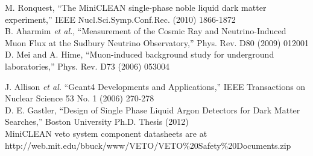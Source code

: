 \documentclass{JINST}
\begin{document}
\begin{thebibliography}{999}

M. Ronquest, ``The MiniCLEAN single-phase noble liquid dark matter experiment,'' IEEE Nucl.Sci.Symp.Conf.Rec. (2010) 1866-1872 \\

B. Aharmim {\it et al.}, ``Measurement of the Cosmic Ray and Neutrino-Induced Muon Flux at the Sudbury Neutrino Observatory,'' Phys. Rev. D80 (2009) 012001 \\

D. Mei and A. Hime, ``Muon-induced background study for underground laboratories,'' Phys. Rev. D73 (2006) 053004

J. Allison {\it et al.} ``Geant4 Developments and Applications,'' IEEE Transactions on Nuclear Science 53 No. 1 (2006) 270-278 \\

D. E. Gastler, ``Design of Single Phase Liquid Argon Detectors for Dark Matter Searches,'' Boston University Ph.D. Thesis (2012) \\

 MiniCLEAN veto system component datasheets are at http://web.mit.edu/bbuck/www/VETO/VETO\%20Safety\%20Documents.zip \\

\end{thebibliography}
\end{document}
